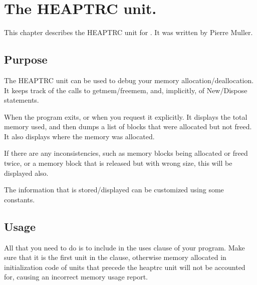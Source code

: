 %
%
%
%
%
\chapter{The HEAPTRC unit.}
This chapter describes the HEAPTRC unit for \fpc. It was written by 
Pierre Muller.

\section{Purpose}

The HEAPTRC unit can be used to debug your memory allocation/deallocation.
It keeps track of the calls to getmem/freemem, and, implicitly, of
New/Dispose statements.

When the program exits, or when you request it explicitly.
It displays the total memory used, and then dumps a list of blocks that
were allocated but not freed. It also displays where the memory was
allocated.

If there are any inconsistencies, such as memory blocks being allocated
or freed twice, or a memory block that is released but with wrong size,
this will be displayed also.

The information that is stored/displayed can be customized using
some constants.


\section{Usage}

All that you need to do is to include  in the uses clause
of your program. Make sure that it is the first unit in the clause,
otherwise memory allocated in initialization code of units that precede the
heaptrc unit will not be accounted for, causing an incorrect memory usage
report.


